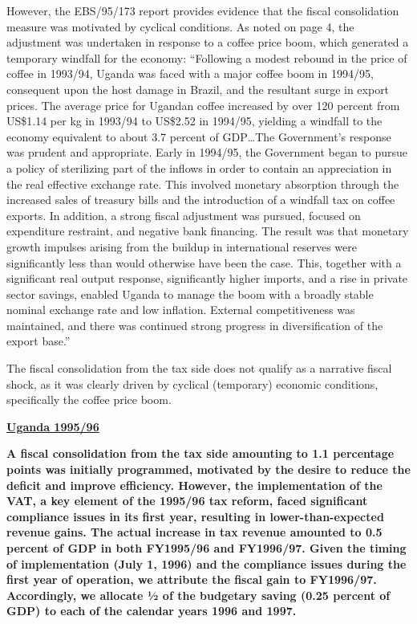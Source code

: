 However, the EBS/95/173 report provides evidence that the fiscal consolidation measure was motivated by cyclical conditions. As noted on page 4, the adjustment was undertaken in response to a coffee price boom, which generated a temporary windfall for the economy: “Following a modest rebound in the price of coffee in 1993/94, Uganda was faced with a major coffee boom in 1994/95, consequent upon the host damage in Brazil, and the resultant surge in export prices. The average price for Ugandan coffee increased by over 120 percent from US\$1.14 per kg in 1993/94 to US\$2.52 in 1994/95, yielding a windfall to the economy equivalent to about 3.7 percent of GDP…The Government’s response was prudent and appropriate. Early in 1994/95, the Government began to pursue a policy of sterilizing part of the inflows in order to contain an appreciation in the real effective exchange rate. This involved monetary absorption through the increased sales of treasury bills and the introduction of a windfall tax on coffee exports. In addition, a strong fiscal adjustment was pursued, focused on expenditure restraint, and negative bank financing. The result was that monetary growth impulses arising from the buildup in international reserves were significantly less than would otherwise have been the case.  This, together with a significant real output response, significantly higher imports, and a rise in private sector savings, enabled Uganda to manage the boom with a broadly stable nominal exchange rate and low inflation. External competitiveness was maintained, and there was continued strong progress in diversification of the export base.”

The fiscal consolidation from the tax side does not qualify as a narrative fiscal shock, as it was clearly driven by cyclical (temporary) economic conditions, specifically the coffee price boom. 

\textbf{\underline{Uganda 1995/96}}

\textbf{A fiscal consolidation from the tax side amounting to 1.1 percentage points was initially programmed, motivated by the desire to reduce the deficit and improve efficiency. However, the implementation of the VAT, a key element of the 1995/96 tax reform, faced significant compliance issues in its first year, resulting in lower-than-expected revenue gains. The actual increase in tax revenue amounted to 0.5 percent of GDP in both FY1995/96 and FY1996/97. Given the timing of implementation (July 1, 1996) and the compliance issues during the first year of operation, we attribute the fiscal gain to FY1996/97. Accordingly, we allocate ½ of the budgetary saving (0.25 percent of GDP) to each of the calendar years 1996 and 1997.}

